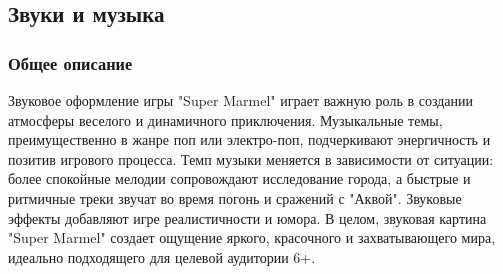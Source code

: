 \documentclass[article,12pt, fleqn]{article}
\begin{document}
\begin{itemize}
\begin{itemize}
\begin{itemize}
\begin{figure}[ht]
            \begin{minipage}[b]{0.3\textwidth}
            \end{minipage}
            \caption{}
        \end{figure}
    \end{itemize}
\end{itemize}
\subsection{Звуки и музыка}
\subsubsection{Общее описание}
Звуковое оформление игры "Super Marmel" играет важную роль в создании атмосферы веселого и динамичного приключения. Музыкальные темы, преимущественно в жанре поп или электро-поп, подчеркивают энергичность и позитив игрового процесса. Темп музыки меняется в зависимости от ситуации: более спокойные мелодии сопровождают исследование города, а быстрые и ритмичные треки звучат во время погонь и сражений с "Аквой". Звуковые эффекты добавляют игре реалистичности и юмора. В целом, звуковая картина "Super Marmel" создает ощущение яркого, красочного и захватывающего мира, идеально подходящего для целевой аудитории 6+.

\end{itemize}
\end{document}
